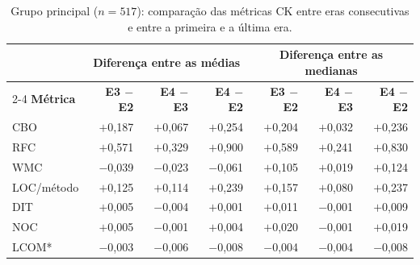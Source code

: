 \begin{table}[htbp]
\centering\footnotesize
\caption{Grupo principal ($n = 517$): comparação das métricas CK entre eras consecutivas e entre a primeira e a última era.}
\label{tab:diferencas_principal}
\begin{tabular}{l|rrr|rrr}
\hline
 & \multicolumn{3}{|c}{\textbf{Diferença entre as médias}} & \multicolumn{3}{|c}{\textbf{Diferença entre as medianas}} \\
\cline{2-4}\cline{5-7}
\textbf{Métrica} & \textbf{E3 $-$ E2} & \textbf{E4 $-$ E3} & \textbf{E4 $-$ E2} & \textbf{E3 $-$ E2} & \textbf{E4 $-$ E3} & \textbf{E4 $-$ E2} \\ \hline
CBO & $+$0,187 & $+$0,067 & $+$0,254 & $+$0,204 & $+$0,032 & $+$0,236 \\
RFC & $+$0,571 & $+$0,329 & $+$0,900 & $+$0,589 & $+$0,241 & $+$0,830 \\
WMC & $-$0,039 & $-$0,023 & $-$0,061 & $+$0,105 & $+$0,019 & $+$0,124 \\
LOC/método & $+$0,125 & $+$0,114 & $+$0,239 & $+$0,157 & $+$0,080 & $+$0,237 \\
DIT & $+$0,005 & $-$0,004 & $+$0,001 & $+$0,011 & $-$0,001 & $+$0,009 \\
NOC & $+$0,005 & $-$0,001 & $+$0,004 & $+$0,020 & $-$0,001 & $+$0,019 \\
LCOM* & $-$0,003 & $-$0,006 & $-$0,008 & $-$0,004 & $-$0,004 & $-$0,008 \\
\hline
\end{tabular}
\end{table}
